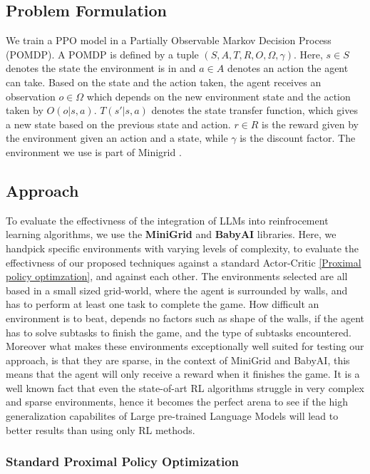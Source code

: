 \documentclass[conference]{IEEEtran}
\begin{document}
\subsection{Problem Formulation}

We train a PPO model in a Partially Observable Markov Decision Process (POMDP). A POMDP is defined by a tuple $(S, A, T, R, O, \Omega, \gamma)$. Here, $s \in S$ denotes the state the environment is in and $a \in A$ denotes an action the agent can take. Based on the state and the action taken, the agent receives an observation $o \in \Omega$ which depends on the new environment state and the action taken by $O(o | s, a)$. $T(s' | s, a)$ denotes the state transfer function, which gives a new state based on the previous state and action. $r \in R$ is the reward given by the environment given an action and a state, while $\gamma$ is the discount factor.  The environment we use is part of Minigrid \cite{minigrid}. 

\subsection{Approach}

To evaluate the effectivness of the integration of LLMs into reinfrocement learning algorithms, we use the \textbf{MiniGrid} and \textbf{BabyAI} libraries. Here, we handpick specific environments with varying levels of complexity, to evaluate the effectivness of our proposed techniques against a standard Actor-Critic \ref{Proximal policy optimzation}, and against each other. The environments selected are all based in a small sized grid-world, where the agent is surrounded by walls, and has to perform at least one task to complete the game. How difficult an environment is to beat, depends no factors such as shape of the walls, if the agent has to solve subtasks to finish the game, and the type of subtasks encountered. Moreover what makes these environments exceptionally well suited for testing our approach, is that they are sparse, in the context of MiniGrid and BabyAI, this means that the agent will only receive a reward when it finishes the game. It is a well known fact that even the state-of-art RL algorithms struggle in very complex and sparse environments, hence it becomes the perfect arena to see if the high generalization capabilites of Large pre-trained Language Models will lead to better results than using only RL methods.


\subsubsection{Standard Proximal Policy Optimization}
\end{document}
